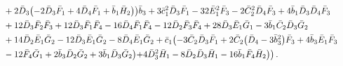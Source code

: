 \documentclass[10pt]{amsart}
\theoremstyle{definition}
\theoremstyle{corollary}
\theoremstyle{remark}
\theoremstyle{conclusion}
\begin{document}
\begin{align}
& \hskip 0.7cm+2 \bar{D}_3 \bigl(-2 \bar{D}_3 \bar{F}_1+4 \bar{D}_4 \bar{F}_1+\bar{b}_1 \bar{H}_2\bigl)\bigl) \bar{b}_3+3 \bar{c}_1^2 \bar{D}_3 \bar{F}_1-32 \bar{E}_1^2 \bar{F}_3-2 \bar{C}_2^2 \bar{D}_4 \bar{F}_3+4 \bar{b}_1 \bar{D}_3 \bar{D}_4 \bar{F}_3\nonumber \\
& \hskip 0.7cm+12 \bar{D}_3 \bar{F}_2 \bar{F}_3+12 \bar{D}_3 \bar{F}_1 \bar{F}_4-16 \bar{D}_4 \bar{F}_1 \bar{F}_4-12 \bar{D}_2 \bar{F}_3 \bar{F}_4+28 \bar{D}_3 \bar{E}_1 \bar{G}_1-3 \bar{b}_1 \bar{C}_2 \bar{D}_3 \bar{G}_2\nonumber \\
& \hskip 0.7cm+14 \bar{D}_2 \bar{E}_1 \bar{G}_2-12 \bar{D}_3 \bar{E}_1 \bar{G}_2-8 \bar{D}_4 \bar{E}_1 \bar{G}_2+\bar{c}_1 \bigl(-3 \bar{C}_2 \bar{D}_3 \bar{F}_1+2 \bar{C}_2 \bigl(\bar{D}_4-3 \bar{b}_3^2\bigl) \bar{F}_3+4 \bar{b}_3 \bar{E}_1 \bar{F}_3\nonumber \\
& \hskip 0.7cm-12 \bar{F}_4 \bar{G}_1+2 \bar{b}_3 \bar{D}_2 \bar{G}_2+3 \bar{b}_1 \bar{D}_3 \bar{G}_2\bigl)+4 \bar{D}_3^2 \bar{H}_1-8 \bar{D}_2 \bar{D}_3 \bar{H}_1-16 \bar{b}_1 \bar{F}_4 \bar{H}_2\bigl)\bigl) \, .
\end{align} 
\end{document}

